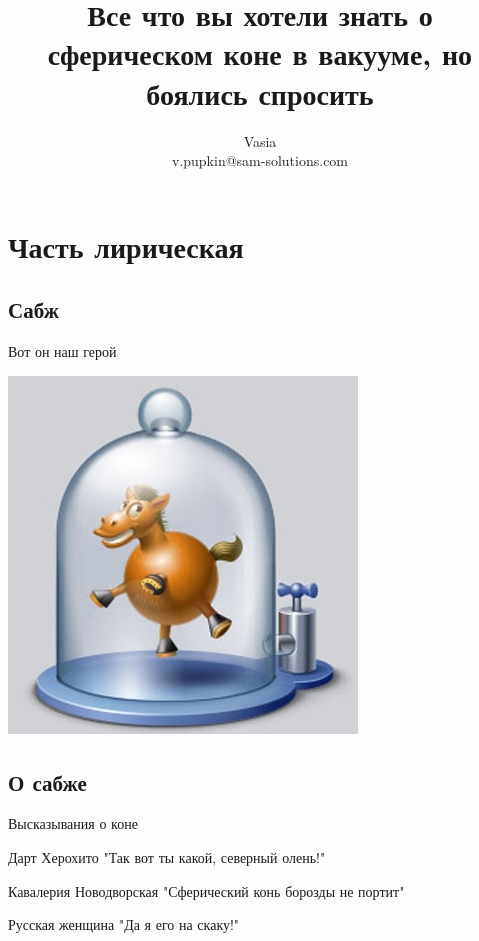\documentclass[ignorenonframetext,hyperref={pdftex,unicode}]{beamer}
\title{Все что вы хотели знать о сферическом коне в вакууме, но боялись спросить} %
\author{Vasia\\v.pupkin@sam-solutions.com} %
\begin{document}

\frame{\titlepage} %


\section{Часть лирическая} %
\subsection{Сабж} %

\begin{frame}{Вот он наш герой} %
	\begin{center}
 		\includegraphics[height=.8\textheight]{Sphere_horse} %
	\end{center}
\end{frame} %

\subsection{О сабже}
\begin{frame}{Высказывания о коне}
	\pause    %
	\begin{block}{Дарт Херохито}
 		"Так вот ты какой, северный олень!"
	\end{block}
	\pause
	\begin{block}{Кавалерия Новодворская}
 		"Сферический конь борозды не портит"
	\end{block}
	\pause
	\begin{block}{Русская женщина}
 		"Да я его на скаку!"
	\end{block}
\end{frame}
\end{document}
